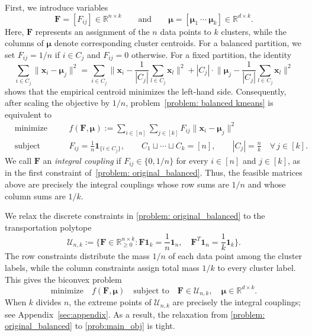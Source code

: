 \documentclass{article}
\theoremstyle{plain}
\theoremstyle{definition}
\newcommand{\1}{\mathbf{1}}
\newcommand{\Rdk}{\mathbb{R}^{d\times k}}
\newcommand{\bUnk}{\mathcal{U}_{n,k}}
\newcommand{\bmF}{\bm{F}}
\newcommand{\bmu}{\bm{\mu}}
\begin{document}
First, we introduce variables
\[
\bmF=[F_{ij}]\in\mathbb{R}^{n\times k}
\qquad
\text{and}
\qquad
\bmu=[\bmu_1\ \cdots\ \bmu_k]\in\mathbb{R}^{d\times k}.
\]
Here, $\bmF$ represents an assignment of the $n$ data points to $k$ clusters, while the columns of $\bmu$ denote corresponding cluster centroids.
For a balanced partition, we set $F_{ij}=1/n$ if $i\in C_j$ and $F_{ij}=0$ otherwise.
For a fixed partition, the identity
\[
\sum_{i\in C_j}\|\bm{x}_i-\bmu_j\|^2
=
\sum_{i\in C_j}\bigg\|\bm{x}_i-\frac{1}{|C_j|}\sum_{l\in C_j}\bm{x}_l\bigg\|^2
+
|C_j|\cdot\bigg\|\bmu_j-\frac{1}{|C_j|}\sum_{l\in C_j}\bm{x}_l\bigg\|^2
\]
shows that the empirical centroid minimizes the left-hand side.
Consequently, after scaling the objective by $1/n$, problem~\eqref{problem: balanced kmeans} is equivalent to
\begin{equation}
\label{problem: original_balanced}
\begin{aligned}
    & \text{minimize}
    &&\quad f(\bmF,\bmu):=\sum_{i\in[n]}\sum_{j\in[k]}F_{ij}\|\bm{x}_i-\bmu_j\|^2 \\[5pt]
    & \text{subject to}
    &&\quad F_{ij}=\frac{1}{n}\bm{1}_{\{i\in C_j\}}, \qquad C_1\sqcup\cdots\sqcup C_k=[n], \qquad |C_j|=\frac{n}{k} \quad \forall\,j\in[k].
\end{aligned}
\end{equation}
We call $\bmF$ an \textit{integral coupling} if $F_{ij}\in\{0,1/n\}$ for every $i\in[n]$ and $j\in[k]$, as in the first constraint of~\eqref{problem: original_balanced}. 
Thus, the feasible matrices above are precisely the integral couplings whose row sums are $1/n$ and whose column sums are $1/k$.

We relax the discrete constraints in \eqref{problem: original_balanced} to the transportation polytope
\[
\bUnk:=\bigg\{\bmF\in\mathbb{R}^{n\times k}_{\geq0}:\bmF\bm{1}_k=\frac{1}{n}\bm{1}_n,\quad \bmF^T\bm{1}_n=\frac{1}{k}\bm{1}_k\bigg\}.
\]
The row constraints distribute the mass $1/n$ of each data point among the cluster labels, while the column constraints assign total mass $1/k$ to every cluster label.
This gives the biconvex problem
\begin{equation}
\label{prob:main_obj}
\text{minimize}\quad f(\bmF,\bmu)
\quad\text{subject to}\quad \bmF\in\bUnk,\quad \bmu\in\Rdk.
\end{equation}
When $k$ divides $n$, the extreme points of $\bUnk$ are precisely the integral couplings; see Appendix~\ref{sec:appendix}.
As a result, the relaxation from \eqref{problem: original_balanced} to \eqref{prob:main_obj} is tight.
\end{document}
